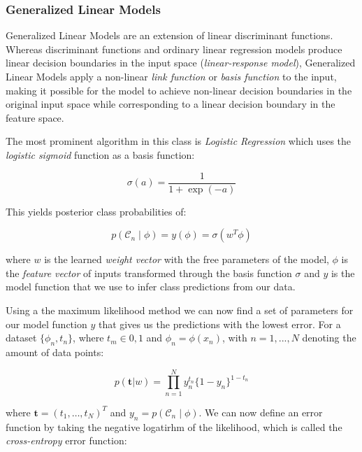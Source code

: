 \subsubsection{Generalized Linear Models}
\label{subs:Generalized Linear Modelsl}

Generalized Linear Models are an extension of linear discriminant functions. Whereas discriminant functions and ordinary linear regression models produce linear decision boundaries in the input space (\emph{linear-response model}), Generalized Linear Models apply a non-linear \emph{link function} or \emph{basis function} to the input, making it possible for the model to achieve non-linear decision boundaries in the original input space while corresponding to a linear decision boundary in the feature space.

The most prominent algorithm in this class is \emph{Logistic Regression} which uses the \emph{logistic sigmoid} function as a basis function:

\begin{equation}
  \sigma (a) = \frac{1}{1 + \exp(-a)}
\end{equation}

This yields posterior class probabilities of:

\begin{equation}
  p(\mathcal{C}_n \mid \phi) = y(\phi) = \sigma(w^T  \phi)
\end{equation}

where $w$ is the learned \emph{weight vector} with the free parameters of the model, $\phi$ is the \emph{feature vector} of inputs transformed through the basis function $\sigma$ and $y$ is the model function that we use to infer class predictions from our data.

Using a the maximum likelihood method we can now find a set of parameters for our model function $y$ that gives us the predictions with the lowest error. For a dataset $\{ \phi_n, t_n \}$, where $t_m \in {0, 1}$ and $\phi_n = \phi(x_n)$, with $n = 1, . . ., N$ denoting the amount of data points:

\begin{equation}
  p(\mathbf{t} | w) = \prod_{n=1}^N y_n^{t_n} \{ 1 - y_n \}^{1-t_n}
\end{equation}

where $\mathbf{t} = (t_1, \ldots, t_N)^T$ and $y_n = p(\mathcal{C}_n \mid \phi)$. We can now define an error function by taking the negative logatirhm of the likelihood, which is called the \emph{cross-entropy} error function:

